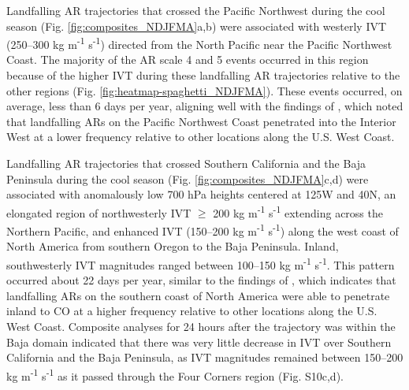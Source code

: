 \documentclass[draft]{agujournal2019}
\begin{document}

Landfalling AR trajectories that crossed the Pacific Northwest during the cool season (Fig. \ref{fig:composites_NDJFMA}a,b) were associated with westerly IVT (250--300 kg m\textsuperscript{-1} s\textsuperscript{-1}) directed from the North Pacific near the Pacific Northwest Coast. The majority of the AR scale 4 and 5 events occurred in this region because of the higher IVT during these landfalling AR trajectories relative to the other regions (Fig. \ref{fig:heatmap-spaghetti_NDJFMA}). These events occurred, on average, less than 6 days per year, aligning well with the findings of , which noted that landfalling ARs on the Pacific Northwest Coast penetrated into the Interior West at a lower frequency relative to other locations along the U.S. West Coast.

Landfalling AR trajectories that crossed Southern California and the Baja Peninsula during the cool season (Fig. \ref{fig:composites_NDJFMA}c,d) were associated with anomalously low 700 hPa heights centered at 125\textdegree W and 40\textdegree N, an elongated region of northwesterly IVT $\geq$ 200 kg m\textsuperscript{-1} s\textsuperscript{-1} extending across the Northern Pacific, and enhanced IVT (150--200 kg m\textsuperscript{-1} s\textsuperscript{-1}) along the west coast of North America from southern Oregon to the Baja Peninsula. Inland, southwesterly IVT magnitudes ranged between 100--150 kg m\textsuperscript{-1} s\textsuperscript{-1}. This pattern occurred about 22 days per year, similar to the findings of , which indicates that landfalling ARs on the southern coast of North America were able to penetrate inland to CO at a higher frequency relative to other locations along the U.S. West Coast. Composite analyses for 24 hours after the trajectory was within the Baja domain indicated that there was very little decrease in IVT over Southern California and the Baja Peninsula, as IVT magnitudes remained between 150--200 kg m\textsuperscript{-1} s\textsuperscript{-1} as it passed through the Four Corners region (Fig. S10c,d). 

\end{document}
